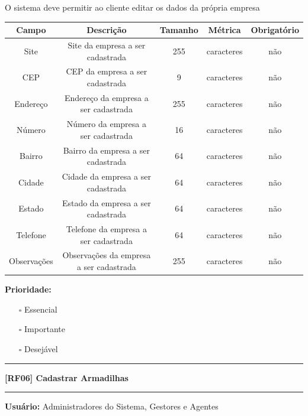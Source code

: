 	O sistema deve permitir ao cliente editar os dados da própria empresa
	
	\begin{center}
		\begin{adjustbox}{width=\textwidth}      \begin{tabular}{ |c|c|c|c|c| } 
			\hline
			\rowcolor{lightgray} Campo & Descrição & Tamanho & Métrica & Obrigatório \\   
			\hline
			Site & Site da empresa a ser cadastrada & 255 & caracteres & não \\ 
			\hline
			CEP & CEP da empresa a ser cadastrada & 9 & caracteres & não \\ 
			\hline
			Endereço & Endereço da empresa a ser cadastrada & 255 & caracteres & não \\ 
			\hline
			Número & Número da empresa a ser cadastrada & 16 & caracteres & não \\ 
			\hline
			Bairro & Bairro da empresa a ser cadastrada & 64 & caracteres & não \\ 
			\hline
			Cidade & Cidade da empresa a ser cadastrada & 64 & caracteres & não \\ 
			\hline
			Estado & Estado da empresa a ser cadastrada & 64 & caracteres & não \\ 
			\hline
			Telefone & Telefone da empresa a ser cadastrada & 64 & caracteres & não \\ 
			\hline
			Observações & Observações da empresa a ser cadastrada & 255 & caracteres & não \\    
			\hline
		\end{tabular}    \end{adjustbox}
	\end{center}
	
	\textbf{Prioridade: }\begin{itemize}
		\item[\hspace{1cm}\rlap{\raisebox{0.2ex}{\hspace{0.4ex}\scriptsize \ding{56}}}$\square$]
		Essencial
		\item[\hspace{1cm}$\square$]
		Importante
		\item[\hspace{1cm}$\square$]
		Desejável
	\end{itemize}
	\begin{center}
		\noindent\rule{10cm}{0.4pt}
		\textbf{[RF06] Cadastrar Armadilhas}
		\noindent\rule{10cm}{0.4pt}
	\end{center}
	\textbf{Usuário:} Administradores do Sistema, Gestores e Agentes
	
